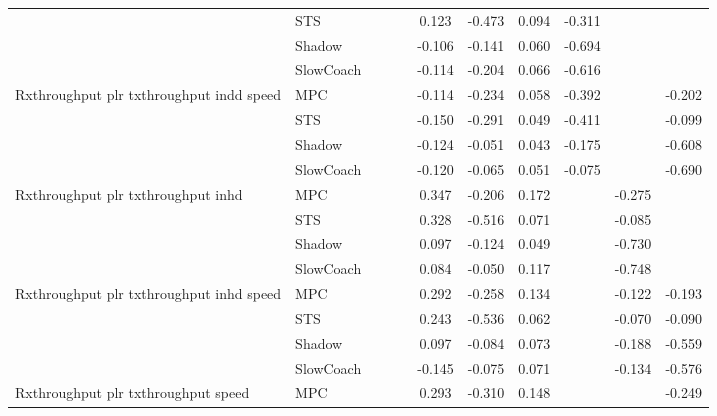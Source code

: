 \begin{tabular}{|l|l|*{9}{c|}}
                              & STS &       &        &        &  0.123 & -0.473 &  0.094 &  -0.311 &      &       \\
                              & Shadow &       &        &        & -0.106 & -0.141 &  0.060 &  -0.694 &      &       \\
                              & SlowCoach &       &        &        & -0.114 & -0.204 &  0.066 &  -0.616 &      &       \\
\midrule
Rxthroughput plr txthroughput indd speed    & MPC &       &        &        & -0.114 & -0.234 &  0.058 &  -0.392 &      &   -0.202 \\
                              & STS &       &        &        & -0.150 & -0.291 &  0.049 &  -0.411 &      &   -0.099 \\
                              & Shadow &       &        &        & -0.124 & -0.051 &  0.043 &  -0.175 &      &   -0.608 \\
                              & SlowCoach &       &        &        & -0.120 & -0.065 &  0.051 &  -0.075 &      &   -0.690 \\
\midrule
Rxthroughput plr txthroughput inhd    & MPC &       &        &        &  0.347 & -0.206 &  0.172 &      &  -0.275 &       \\
                              & STS &       &        &        &  0.328 & -0.516 &  0.071 &      &  -0.085 &       \\
                              & Shadow &       &        &        &  0.097 & -0.124 &  0.049 &      &  -0.730 &       \\
                              & SlowCoach &       &        &        &  0.084 & -0.050 &  0.117 &      &  -0.748 &       \\
\midrule
Rxthroughput plr txthroughput inhd speed    & MPC &       &        &        &  0.292 & -0.258 &  0.134 &      &  -0.122 &   -0.193 \\
                              & STS &       &        &        &  0.243 & -0.536 &  0.062 &      &  -0.070 &   -0.090 \\
                              & Shadow &       &        &        &  0.097 & -0.084 &  0.073 &      &  -0.188 &   -0.559 \\
                              & SlowCoach &       &        &        & -0.145 & -0.075 &  0.071 &      &  -0.134 &   -0.576 \\
\midrule
Rxthroughput plr txthroughput speed    & MPC &       &        &        &  0.293 & -0.310 &  0.148 &      &      &   -0.249 \\

\end{tabular}
